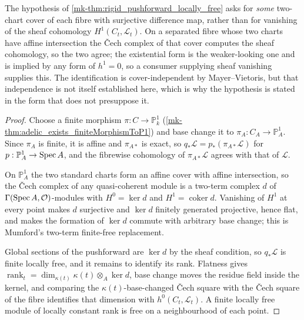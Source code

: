 \begin{remark}
  \label{mk-rem:fiber_h1_vanishing_form}
  The hypothesis of \ref{mk-thm:rigid_pushforward_locally_free} asks for
  \emph{some} two-chart cover of each fibre with surjective difference map,
  rather than for vanishing of the sheaf cohomology \(H^1(C_t, \mathcal{L}_t)\).
  On a separated fibre whose two charts have affine intersection the {\v C}ech
  complex of that cover computes the sheaf cohomology, so the two agree; the
  existential form is the weaker-looking one and is implied by any form of
  \(h^1 = 0\), so a consumer supplying sheaf vanishing supplies this. The
  identification is cover-independent by Mayer--Vietoris, but that
  independence is not itself established here, which is why the hypothesis is
  stated in the form that does not presuppose it.
\end{remark}

\begin{proof}
  Choose a finite morphism \(\pi : C \to \mathbb{P}^1_k\)
  (\ref{mk-thm:adelic_exists_finiteMorphismToP1}) and base change it to
  \(\pi_A : C_A \to \mathbb{P}^1_A\). Since \(\pi_A\) is finite, it is affine and
  \(\pi_{A*}\) is exact, so \(q_* \mathcal{L} = p_* (\pi_{A*} \mathcal{L})\) for
  \(p : \mathbb{P}^1_A \to \operatorname{Spec} A\), and the fibrewise cohomology of
  \(\pi_{A*}\mathcal{L}\) agrees with that of \(\mathcal{L}\).

  On \(\mathbb{P}^1_A\) the two standard charts form an affine cover with affine
  intersection, so the {\v C}ech complex of any quasi-coherent module is a
  two-term complex \(d\) of \(\Gamma(\operatorname{Spec} A, \mathcal{O})\)-modules with
  \(H^0 = \ker d\) and \(H^1 = \operatorname{coker} d\). Vanishing of \(H^1\) at
  every point makes \(d\) surjective and \(\ker d\) finitely generated
  projective, hence flat, and makes the formation of \(\ker d\) commute with
  arbitrary base change; this is Mumford's two-term finite-free replacement.

  Global sections of the pushforward are \(\ker d\) by the sheaf condition, so
  \(q_* \mathcal{L}\) is finite locally free, and it remains to identify its
  rank. Flatness gives
  \(\operatorname{rank}_t = \dim_{\kappa(t)} \kappa(t) \otimes_A \ker d\), base
  change moves the residue field inside the kernel, and comparing the
  \(\kappa(t)\)-base-changed {\v C}ech square with the {\v C}ech square of the
  fibre identifies that dimension with \(h^0(C_t, \mathcal{L}_t)\). A finite
  locally free module of locally constant rank is free on a neighbourhood of each
  point.
\end{proof}

